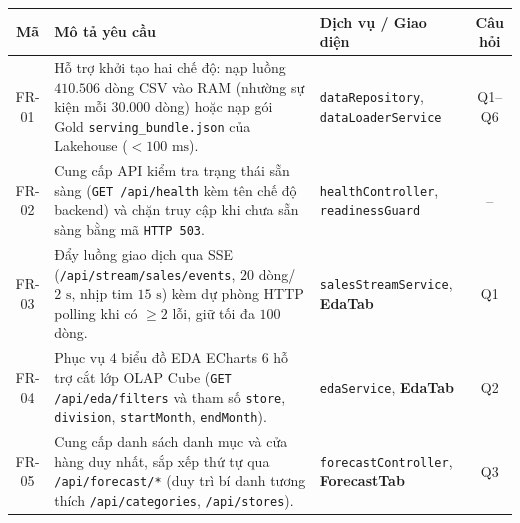 \begin{table}[H]
	\centering
	\footnotesize
	\setlength{\tabcolsep}{3.5pt}
	\begin{tabular}{c p{9.1cm} p{3.7cm} c}
		\toprule
		\textbf{Mã} & \textbf{Mô tả yêu cầu}                                                                                                                                                                                                                                           & \textbf{Dịch vụ / Giao diện}                                                        & \textbf{Câu hỏi} \\
		\midrule
		FR-01       & Hỗ trợ khởi tạo hai chế độ: nạp luồng $410.506$ dòng CSV vào RAM (nhường sự kiện mỗi $30.000$ dòng) hoặc nạp gói Gold \texttt{serving_bundle.json} của Lakehouse ($< 100\text{ ms}$).                                                                  & \texttt{dataRepository}, \texttt{dataLoaderService} & Q1--Q6           \\
		FR-02       & Cung cấp API kiểm tra trạng thái sẵn sàng (\texttt{GET /api/health} kèm tên chế độ backend) và chặn truy cập khi chưa sẵn sàng bằng mã \texttt{HTTP 503}.                                                                                    & \texttt{healthController}, \texttt{readinessGuard}  & --               \\
		FR-03       & Đẩy luồng giao dịch qua SSE (\texttt{/api/stream/sales/events}, $20$ dòng/$2\text{ s}$, nhịp tim $15\text{ s}$) kèm dự phòng HTTP polling khi có $\ge 2$ lỗi, giữ tối đa $100$ dòng.                                                                   & \texttt{salesStreamService}, \textbf{EdaTab}                        & Q1               \\
		FR-04       & Phục vụ $4$ biểu đồ EDA ECharts 6 hỗ trợ cắt lớp OLAP Cube (\texttt{GET /api/eda/filters} và tham số \texttt{store}, \texttt{division}, \texttt{startMonth}, \texttt{endMonth}).                               & \texttt{edaService}, \textbf{EdaTab}                                & Q2               \\
		FR-05       & Cung cấp danh sách danh mục và cửa hàng duy nhất, sắp xếp thứ tự qua \texttt{/api/forecast/*} (duy trì bí danh tương thích \texttt{/api/categories}, \texttt{/api/stores}).                                                  & \texttt{forecastController}, \textbf{ForecastTab}                   & Q3               \\

\end{tabular}
\end{table}
